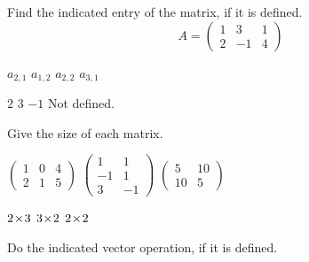 \begin{exercises}
  \recommended \item  
    Find the indicated entry of the matrix,
    if it is defined.
    \begin{equation*}
      A=\begin{pmatrix}
        1  &3  &1  \\
        2  &-1 &4
      \end{pmatrix}
    \end{equation*}
    \begin{exparts*}
      \partsitem \( a_{2,1} \)
      \partsitem \( a_{1,2} \)
      \partsitem \( a_{2,2} \)
      \partsitem \( a_{3,1} \)
    \end{exparts*}
    \begin{answer}
      \begin{exparts*}
        \partsitem \( 2 \)
        \partsitem \( 3 \)
        \partsitem \(-1 \)
        \partsitem Not defined.
      \end{exparts*}  
    \end{answer}
  \recommended \item 
    Give the size of each matrix.
    \begin{exparts*}
      \partsitem \(
        \begin{pmatrix}
          1  &0  &4  \\
          2  &1  &5
        \end{pmatrix}  \)
      \partsitem \(
        \begin{pmatrix}
          1  &1  \\
         -1  &1  \\
          3  &-1
        \end{pmatrix}  \)
      \partsitem \(
        \begin{pmatrix}
          5  &10 \\
         10  &5
        \end{pmatrix}  \)
    \end{exparts*}
    \begin{answer}
      \begin{exparts*}
        \partsitem \( 2 \! \times \! 3 \)
        \partsitem \( 3 \! \times \! 2 \)
        \partsitem \( 2 \! \times \! 2 \)
      \end{exparts*}  
    \end{answer}
  \recommended \item 
    Do the indicated vector operation, if it is defined.
    \begin{exparts*}

\end{exparts*}
\end{exercises}
